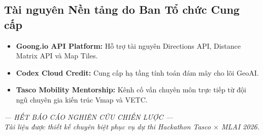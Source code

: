 \documentclass[11pt,a4paper]{article}
\begin{document}
\subsection{Tài nguyên Nền tảng do Ban Tổ chức Cung cấp}
\begin{itemize}
  \item \textbf{Goong.io API Platform:} Hỗ trợ tài nguyên Directions API, Distance Matrix API và Map Tiles.
  \item \textbf{Codex Cloud Credit:} Cung cấp hạ tầng tính toán đám mây cho lõi GeoAI.
  \item \textbf{Tasco Mobility Mentorship:} Kênh cố vấn chuyên môn trực tiếp từ đội ngũ chuyên gia kiến trúc Vmap và VETC.
\end{itemize}

\vspace{0.6cm}
\begin{center}
  \small\itshape
  --- HẾT BÁO CÁO NGHIÊN CỨU CHIẾN LƯỢC --- \\
  Tài liệu được thiết kế chuyên biệt phục vụ dự thi Hackathon Tasco $\times$ MLAI 2026.
\end{center}
\end{document}
